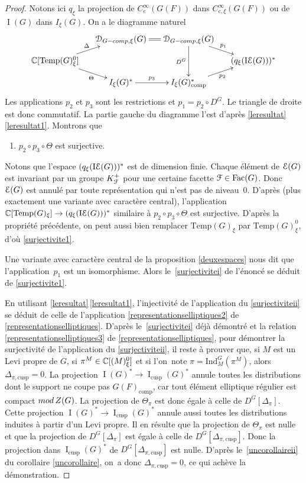 \documentclass[11pt]{article}
\numberwithin{equation}{section}\providecommand{\og}{«\,}\providecommand{\fg}{\,»}
\let\mathcal \EuScript
\newcommand{\NoChangel}[1]{%
\expandafter\let\csname old\string#1\endcsname=#1
\let#1=\relax
\newcommand{#1}{\mathcode`l="716C\csname old\string#1\endcsname\mathcode`l="7160 }%
}
\newcommand{\rmod}{\textup{mod}\,}
\newcommand{\rc}{\mathrm{c}}
\newcommand{\comp}{\mathrm{comp}}
\newcommand{\tcomp}{\textup{-comp}}
\newcommand{\cusp}{\mathrm{cusp}}
\newcommand{\Ell}{\mathrm{Ell}} \NoChangel{\Ell}
\newcommand{\Fac}{\mathrm{Fac}}
\newcommand{\Ind}{\mathrm{Ind}}
\newcommand{\Temp}{\mathrm{Temp}}
\DeclareMathOperator{\rI}{I}
\DeclareMathOperator{\rIE}{I\cE}
\newcommand{\cD}{\mathcal{D}}
\newcommand{\cE}{\mathcal{E}}
\newcommand{\cF}{\mathcal{F}}
\newcommand{\CC}{\mathbb{C}}
\theoremstyle{plain}
\theoremstyle{definition}
\begin{document}
\begin{proof}
Notons ici $q_{\xi}$ la projection de $C_{\rc}^{\infty}(G(F))$ dans $C_{c,\xi}^{\infty}(G(F))$ ou de $\rI(G)$ dans $I_{\xi}(G)$. On a le diagramme naturel
\[
\xymatrix@C=.5cm@R=.3cm{
&\cD_{G\tcomp,\xi}(G)\ar@{=}[r]&\cD_{G\tcomp,\xi}(G)\ar[dd]_-{D^G}\ar[dr]^-{p_1}&\\
\CC[\Temp(G)_{\xi}^0]\ar[ur]^-\Delta\ar[dr]_-\Theta&&&(q_{\xi}(\rIE(G)))^*\\
&I_{\xi}(G)^*\ar[r]^-{p_{3}}&I_{\xi}(G)_{\comp}^*\ar[ur]_-{p_{2}}
}
\]
Les applications $p_{2}$ et $p_{3}$ sont les restrictions et $p_{1}\!=\!p_{2}\circ D^G$. Le triangle de droite est donc commutatif. La partie gauche du diagramme l'est d'après \ref{leresultat}\,\eqref{leresultat1}. Montrons que
\begin{enumerate}
\item\label{surjectivite1}
$p_{2}\circ p_{3}\circ \Theta$ est surjective.
\end{enumerate}

Notons que l'espace $(q_{\xi}(\rIE(G)))^*$ est de dimension finie. Chaque élément de $\cE(G)$ est invariant par un groupe $K_{\cF}^+$ pour une certaine facette $\cF\in \Fac(G)$. Donc $\cE(G)$ est annulé par toute représentation qui n'est pas de niveau~$0$. D'après \cite[Th.\,0(d)]{Kh} (plus exactement une variante avec caractère central), l'application $\CC[\Temp(G)_{\xi}]\to (q_{\xi}(\rIE(G)))^*$ similaire à $p_{2}\circ p_{3}\circ \Theta$ est surjective. D'après la propriété précédente, on peut aussi bien remplacer $\Temp(G)_{\xi}$ par $\Temp(G)_{\xi}^0$, d'où \eqref{surjectivite1}.

Une variante avec caractère central de la proposition \ref{deuxespaces} nous dit que l'application~$p_{1}$ est un isomorphisme. Alors le~\eqref{surjectivitei} de l'énoncé se déduit de \eqref{surjectivite1}.

En utilisant \ref{leresultat}\,\eqref{leresultat1}, l'injectivité de l'application du \eqref{surjectiviteii} se déduit de celle de l'application \eqref{representationselliptiques2} de \ref{representationselliptiques}.
D'après le~\eqref{surjectivitei} déjà démontré et la relation \eqref{representationselliptiques3} de \ref{representationselliptiques}, pour démontrer la surjectivité de l'application du \eqref{surjectiviteii}, il reste à prouver que,
si $M$ est un Levi propre de $G$, si $\pi^M\in \CC[\Ell(M)^0_{\xi}]$ et si l'on~note $\pi=\Ind_{M}^G(\pi^M)$, alors $\Delta_{\pi,\cusp}=0$. La projection $\rI(G)^*\to \rI_{\cusp}(G)^*$ annule toutes les distributions dont le support ne coupe pas $G(F)_{\comp}$, car tout élément elliptique régulier est compact $\rmod Z(G)$. La projection de $\Theta_{\pi}$ est donc égale à celle de $D^G[\Delta_{\pi}]$. Cette projection $\rI(G)^*\to \rI_{\cusp}(G)^*$ annule aussi toutes les distributions induites à partir d'un Levi propre. Il en résulte que la projection de $\Theta_{\pi}$ est nulle et que la projection de $D^G[\Delta_{\pi}]$ est égale à celle de $D^G[\Delta_{\pi,\cusp}]$. Donc la projection dans $\rI_{\cusp}(G)^*$ de $D^G[\Delta_{\pi,\cusp}]$ est nulle. D'après le~\eqref{uncorollaireii} du corollaire \ref{uncorollaire}, on~a donc $\Delta_{\pi,\cusp}=0$, ce qui achève la démonstration.
\end{proof}
\end{document}
